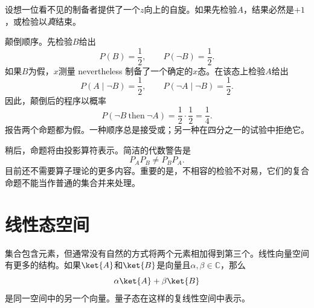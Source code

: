 设想一位看不见的制备者提供了一个\(z\)向上的自旋。如果先检验\(A\)，结果必然是\(+1\)，或检验以\emph{真}结束。

颠倒顺序。先检验\(B\)给出
\[
P(B)=\frac12,\qquad P(\neg B)=\frac12.
\]
如果\(B\)为假，\(x\)测量 nevertheless 制备了一个确定的\(x\)态。在该态上检验\(A\)给出
\[
P(A\mid \neg B)=\frac12,\qquad
P(\neg A\mid \neg B)=\frac12.
\]
因此，颠倒后的程序以概率
\begin{equation}
P(\neg B\ \text{then}\ \neg A)
=\frac12\cdot\frac12=\frac14.
\end{equation}
报告两个命题都为假。一种顺序总是接受或；另一种在四分之一的试验中拒绝它。

\begin{classroomqa}
\end{classroomqa}

\begin{classroomqa}
\end{classroomqa}

稍后，命题将由投影算符表示。简洁的代数警告是
\begin{equation}
P_A P_B\ne P_B P_A.
\end{equation}
目前还不需要算子理论的更多内容。重要的是，不相容的检验不对易，它们的复合命题不能当作普通的集合并来处理。

\begin{classroomqa}
\end{classroomqa}

\section{线性态空间}

集合包含元素，但通常没有自然的方式将两个元素相加得到第三个。线性向量空间有更多的结构。如果\(\ket{A}\)和\(\ket{B}\)是向量且\(\alpha,\beta\in\mathbb C\)，那么
\begin{equation}
\alpha\ket{A}+\beta\ket{B}
\end{equation}
是同一空间中的另一个向量。量子态在这样的复线性空间中表示。

